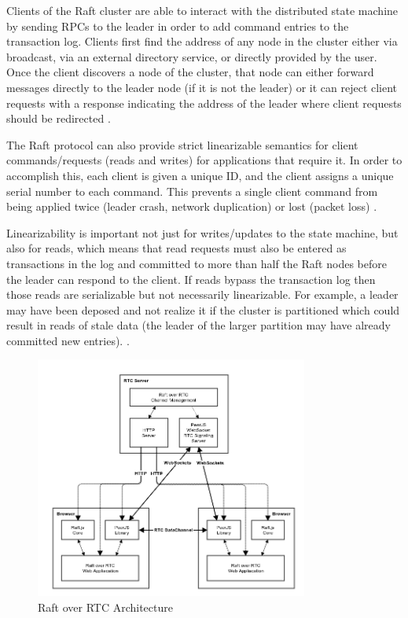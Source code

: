 \documentclass[9pt]{extarticle}
\begin{document}
\begin{multicols}{2}
Clients of the Raft cluster are able to interact with the distributed
state machine by sending RPCs to the leader in order to add command
entries to the transaction log. Clients first find the address of any
node in the cluster either via broadcast, via an external directory
service, or directly provided by the user. Once the client discovers
a node of the cluster, that node can either forward messages directly
to the leader node (if it is not the leader) or it can reject client
requests with a response indicating the address of the leader where
client requests should be redirected
\cite[Section~6.2]{raft_thesis:ongaro14}.

The Raft protocol can also provide strict linearizable semantics for
client commands/requests (reads and writes) for applications that
require it. In order to accomplish this, each client is given a unique
ID, and the client assigns a unique serial number to each command.
This prevents a single client command from being applied twice (leader
crash, network duplication) or lost (packet loss)
\cite[Section~6.3]{raft_thesis:ongaro14}.

Linearizability is important not just for writes/updates to the state
machine, but also for reads, which means that read requests must also
be entered as transactions in the log and committed to more than half
the Raft nodes before the leader can respond to the client. If reads
bypass the transaction log then those reads are serializable but not
necessarily linearizable. For example, a leader may have been deposed
and not realize it if the cluster is partitioned which could result in
reads of stale data (the leader of the larger partition may have
already committed new entries).
\cite[Section~6.4]{raft_thesis:ongaro14}.

\end{multicols}

\begin{figure}[h]
\centerline{\includegraphics[width=0.8\textwidth]{imgs/raft_rtc_architecture}}
\caption{Raft over RTC Architecture}
  \label{fig:raft_rtc_architecture}
\end{figure}
\end{document}
